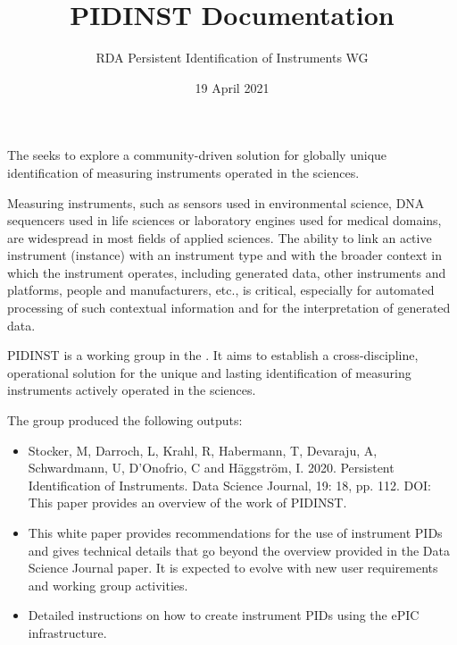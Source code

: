 \documentclass[a4paper,10pt,english]{sphinxmanual}
\title{PIDINST Documentation}
\date{19 April 2021}
\author{RDA Persistent Identification of Instruments WG}
\let\sphinxpxdimen\pdfpxdimen\else\newdimen\sphinxpxdimen
\begin{document}
\pagestyle{empty}
\sphinxmaketitle
\pagestyle{plain}
\sphinxtableofcontents
\pagestyle{normal}
\label{\detokenize{index::doc}}
\noindent{\hspace*{\fill}\sphinxincludegraphics[width=100\sphinxpxdimen]{{pidinst-logo}.pdf}}



The  seeks to explore a community-driven solution for globally
unique identification of measuring instruments operated in the
sciences.

Measuring instruments, such as sensors used in environmental science,
DNA sequencers used in life sciences or laboratory engines used for
medical domains, are widespread in most fields of applied sciences.
The ability to link an active instrument (instance) with an instrument
type and with the broader context in which the instrument operates,
including generated data, other instruments and platforms, people and
manufacturers, etc., is critical, especially for automated processing
of such contextual information and for the interpretation of generated
data.

PIDINST is a working group in the .  It aims to establish a cross-discipline, operational
solution for the unique and lasting identification of measuring
instruments actively operated in the sciences.

The group produced the following outputs:
\begin{itemize}
\item {} 
Stocker, M, Darroch, L, Krahl, R, Habermann, T, Devaraju, A,
Schwardmann, U, D’Onofrio, C and Häggström, I.  2020.  Persistent
Identification of Instruments.  Data Science Journal, 19: 18,
pp. 1\textendash{}12.  DOI:  
This paper provides an overview of the work of PIDINST.

\item {} 
{\hyperref[\detokenize{white-paper/index:white-paper}]{}} 
This white paper provides recommendations for the use of instrument
PIDs and gives technical details that go beyond the overview
provided in the Data Science Journal paper.  It is expected to
evolve with new user requirements and working group activities.

\item {} 
{\hyperref[\detokenize{cookbook/index:epic-cookbook}]{}} 
Detailed instructions on how to create instrument PIDs using the
ePIC infrastructure.

\end{itemize}
\end{document}

